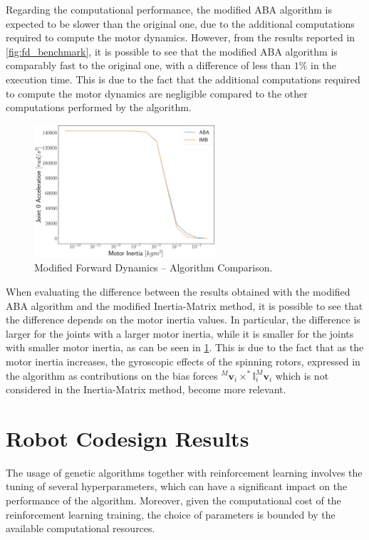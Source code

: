 Regarding the computational performance, the modified \ac{ABA} algorithm is expected to be slower than the original one, due to the additional computations required to compute the motor dynamics. However, from the results reported in \cref{fig:fd_benchmark}, it is possible to see that the modified \ac{ABA} algorithm is comparably fast to the original one, with a difference of less than $1\%$ in the execution time. This is due to the fact that the additional computations required to compute the motor dynamics are negligible compared to the other computations performed by the algorithm.

\begin{figure}
    \centering
    \caption{Modified Forward Dynamics -- Algorithm Comparison.}
    \label{fig:fd_comparison}
    \includegraphics[width=0.6\textwidth]{Images/Results/ABA_IMB.png}
\end{figure}

When evaluating the difference between the results obtained with the modified \ac{ABA} algorithm and the modified Inertia-Matrix method, it is possible to see that the difference depends on the motor inertia values. In particular, the difference is larger for the joints with a larger motor inertia, while it is smaller for the joints with smaller motor inertia, as can be seen in \cref{fig:fd_comparison}. This is due to the fact that as the motor inertia increases, the gyroscopic effects of the spinning rotors, expressed in the algorithm as contributions on the bias forces ${}^M \mathbf{v}_i \times ^* \mathbb{I} _i ^M \mathbf{v}_i$ which is not considered in the Inertia-Matrix method, become more relevant.


\section{Robot Codesign Results}
\label{sec:codesign_results}

The usage of genetic algorithms together with reinforcement learning involves the tuning of several hyperparameters, which can have a significant impact on the performance of the algorithm. Moreover, given the computational cost of the reinforcement learning training, the choice of parameters is bounded by the available computational resources. 

